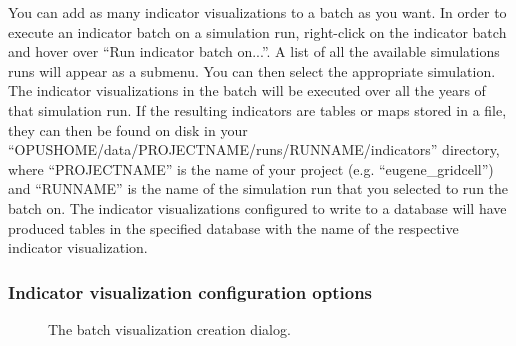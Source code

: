 You can add as many indicator visualizations to a batch as you want. In
order to execute an indicator batch on a simulation run, right-click on
the indicator batch and hover over
 ``Run indicator batch on...''. A list of all the available simulations
 runs will
appear as a submenu. You can then select the appropriate simulation.
The indicator visualizations in the batch will be executed over all the
years of that simulation run. If the resulting indicators are tables or
maps stored in a file, they can then be found on disk in your
``OPUSHOME/data/PROJECTNAME/runs/RUNNAME/indicators'' directory, where
``PROJECTNAME'' is the name of your project (e.g.
 ``eugene\_gridcell'') and ``RUNNAME'' is the name of the
simulation run that you selected to run the batch on. The indicator
visualizations configured to write to a database will have produced
tables in the specified database with the name of the respective
indicator visualization.



\subsubsection{Indicator visualization configuration options}
\label{sect:indicator-visualization-options}


\begin{figure}[tp]
\begin{center}
\end{center}
\caption{The batch visualization creation dialog.}
\label{fig:results-manager-batch-viz}
\end{figure}

